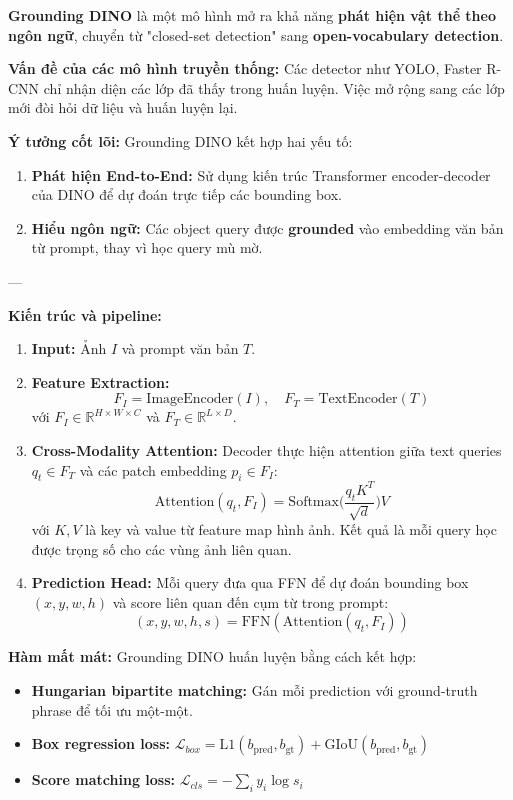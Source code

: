\textbf{Grounding DINO} \cite{Liu2023_GroundingDINO} là một mô hình mở ra khả năng \textbf{phát hiện vật thể theo ngôn ngữ}, chuyển từ "closed-set detection" sang \textbf{open-vocabulary detection}.

\textbf{Vấn đề của các mô hình truyền thống:}  
Các detector như YOLO, Faster R-CNN chỉ nhận diện các lớp đã thấy trong huấn luyện. Việc mở rộng sang các lớp mới đòi hỏi dữ liệu và huấn luyện lại.

\textbf{Ý tưởng cốt lõi:}  
Grounding DINO kết hợp hai yếu tố:
\begin{enumerate}
	\item \textbf{Phát hiện End-to-End:} Sử dụng kiến trúc Transformer encoder-decoder của DINO để dự đoán trực tiếp các bounding box.
	\item \textbf{Hiểu ngôn ngữ:} Các object query được \textbf{grounded} vào embedding văn bản từ prompt, thay vì học query mù mờ.
\end{enumerate}

---

\textbf{Kiến trúc và pipeline:}

\begin{enumerate}
	\item \textbf{Input:} Ảnh $I$ và prompt văn bản $T$.
	\item \textbf{Feature Extraction:}
	\[
	F_I = \text{ImageEncoder}(I), \quad F_T = \text{TextEncoder}(T)
	\]
	với $F_I \in \mathbb{R}^{H \times W \times C}$ và $F_T \in \mathbb{R}^{L \times D}$.
	\item \textbf{Cross-Modality Attention:} Decoder thực hiện attention giữa text queries $q_t \in F_T$ và các patch embedding $p_i \in F_I$:
	\[
	\text{Attention}(q_t, F_I) = \text{Softmax}\Big(\frac{q_t K^T}{\sqrt{d}}\Big) V
	\]
	với $K, V$ là key và value từ feature map hình ảnh. Kết quả là mỗi query học được trọng số cho các vùng ảnh liên quan.
	\item \textbf{Prediction Head:} Mỗi query đưa qua FFN để dự đoán bounding box $(x, y, w, h)$ và score liên quan đến cụm từ trong prompt:
	\[
	(x, y, w, h, s) = \text{FFN}(\text{Attention}(q_t, F_I))
	\]
\end{enumerate}

\textbf{Hàm mất mát:}  
Grounding DINO huấn luyện bằng cách kết hợp:
\begin{itemize}
	\item \textbf{Hungarian bipartite matching:} Gán mỗi prediction với ground-truth phrase để tối ưu một-một.
	\item \textbf{Box regression loss:} $\mathcal{L}_{box} = \text{L1}(b_\text{pred}, b_\text{gt}) + \text{GIoU}(b_\text{pred}, b_\text{gt})$
	\item \textbf{Score matching loss:} $\mathcal{L}_{cls} = - \sum_i y_i \log s_i$
\end{itemize}

